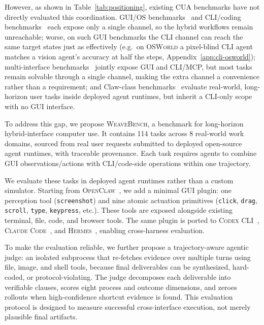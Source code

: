 \documentclass{llmxive}
\providecommand{\Eyeson}{\textsc{WeaveBench}\xspace}
\providecommand{\osworld}{\textsc{OSWorld}\xspace}
\begin{document}
However, as shown in Table~\ref{tab:positioning}, existing CUA benchmarks have not directly evaluated this coordination. GUI/OS benchmarks~\citep{xie2024osworld,bonatti2024waa,rawles2025androidworld,koh2024visualwebarena,zhou2024webarena} and CLI/coding benchmarks~\citep{terminalbench2025,chu2026terminalworld,cheng2026terminalworldsynth} each expose only a single channel, so the hybrid workflows remain unreachable; worse, on such GUI benchmarks the CLI channel can reach the same target states just as effectively (e.g.\ on \osworld{} a pixel-blind CLI agent matches a vision agent's accuracy at half the steps, Appendix~\ref{app:cli-osworld}); multi-interface benchmarks~\citep{yan2025mcpworld,jia2025osworldmcp,aggarwal2025pwp,sun2026scienceboard,hao2026cocoabench,shi2026saasbench} jointly expose GUI and CLI/MCP, but most tasks remain solvable through a single channel, making the extra channel a convenience rather than a requirement; and Claw-class benchmarks~\citep{ding2026wildclawbench,zhang2026clawbench,chu2026terminalworld,ye2026clawEval,li2026clawenvkit,meng2026clawmark,kilocode2026pinchbench} evaluate real-world, long-horizon user tasks inside deployed agent runtimes, but inherit a CLI-only scope with no GUI interface.

To address this gap, we propose \Eyeson{}, a benchmark for long-horizon hybrid-interface computer use. It contains 114 tasks across 8 real-world work domains, sourced from real user requests submitted to deployed open-source agent runtimes, with traceable provenance. Each task requires agents to combine GUI observations/actions with CLI/code-side operations within one trajectory.

We evaluate these tasks in deployed agent runtimes rather than a custom simulator. Starting from \textsc{OpenClaw}~\citep{openclaw2025}, we add a minimal GUI plugin: one perception tool (\texttt{screenshot}) and nine atomic actuation primitives (\texttt{click}, \texttt{drag}, \texttt{scroll}, \texttt{type}, \texttt{keypress}, etc.). These tools are exposed alongside existing terminal, file, code, and browser tools. The same plugin is ported to \textsc{Codex CLI}~\citep{openai2026codexagent}, \textsc{Claude Code}~\citep{anthropic2025claudecode}, and \textsc{Hermes}~\citep{hermes2025}, enabling cross-harness evaluation.

To make the evaluation reliable, we further propose a trajectory-aware agentic judge: an isolated subprocess that re-fetches evidence over multiple turns using file, image, and shell tools, because final deliverables can be synthesized, hard-coded, or protocol-violating. The judge decomposes each deliverable into verifiable clauses, scores eight process and outcome dimensions, and zeroes rollouts when high-confidence shortcut evidence is found. This evaluation protocol is designed to measure successful cross-interface execution, not merely plausible final artifacts.
\end{document}
